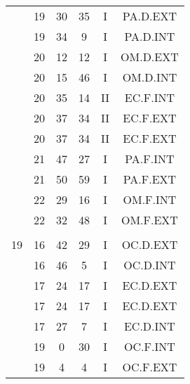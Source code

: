\documentclass[12pt, a4paper]{article}
\begin{document}
\begin{multicols}{3}
{\begin{tabular}{c c c c c c}
	 	 	 	 & 19 & 30 & 35 & I & PA.D.EXT\\%
	 	 	 	 & 19 & 34 & 9 & I & PA.D.INT\\%
	 	 	 	 & 20 & 12 & 12 & I & OM.D.EXT\\%
	 	 	 	 & 20 & 15 & 46 & I & OM.D.INT\\%
	 	 	 	 & 20 & 35 & 14 & II & EC.F.INT\\%
	 	 	 	 & 20 & 37 & 34 & II & EC.F.EXT\\%
	 	 	 	 & 20 & 37 & 34 & II & EC.F.EXT\\%
	 	 	 	 & 21 & 47 & 27 & I & PA.F.INT\\%
	 	 	 	 & 21 & 50 & 59 & I & PA.F.EXT\\%
	 	 	 	 & 22 & 29 & 16 & I & OM.F.INT\\%
	 	 	 	 & 22 & 32 & 48 & I & OM.F.EXT\\%
	 	 	 	 & & & & & \\%
	 	 	 	19 & 16 & 42 & 29 & I & OC.D.EXT\\%
	 	 	 	 & 16 & 46 & 5 & I & OC.D.INT\\%
	 	 	 	 & 17 & 24 & 17 & I & EC.D.EXT\\%
	 	 	 	 & 17 & 24 & 17 & I & EC.D.EXT\\%
	 	 	 	 & 17 & 27 & 7 & I & EC.D.INT\\%
	 	 	 	 & 19 & 0 & 30 & I & OC.F.INT\\%
	 	 	 	 & 19 & 4 & 4 & I & OC.F.EXT\\%
	 	 \end{tabular}
 	}
\end{multicols}
\end{document}
